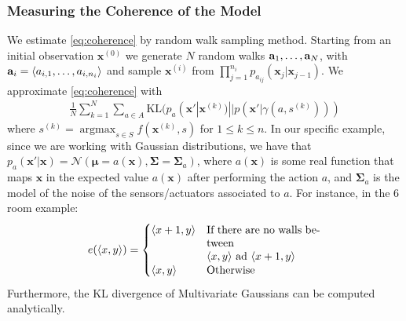 \documentclass{beamer}
\DeclareMathOperator*{\argmax}{argmax}
\def\N{\mathcal{N}}
\def\bmu{\pmb{\mu}}
\def\bSigma{\pmb{\Sigma}}
\def\bx{\pmb{x}}
\begin{document}
\begin{frame}
\frametitle{Measuring the Coherence of the Model}
\footnotesize
We estimate \eqref{eq:coherence} by random walk sampling method. Starting
from an initial observation $\bx^{(0)}$ we generate $N$ random
walks ${\bf a}_1,\dots,{\bf a}_N$, 
%
with
${\bf a}_i=\langle a_{i,1},\dots,a_{i,n_i}\rangle$ and sample $\bx^{(i)}$
from $\prod_{j=1}^{n_i}p_{a_{ij}}(\bx_{j}|\bx_{j-1})$. 
We approximate \eqref{eq:coherence} with
\begin{align}
  \label{eq:coherence-approx}
\frac{1}{N}\sum_{k=1}^N\sum_{a\in A}\mathrm{KL}(p_a(\bx'|\bx^{(k)})|| p(\bx'|\gamma(a,s^{(k)})))
\end{align}
where $s^{(k)} = \argmax_{s\in S}f(\bx^{(k)},s)$ for $1\leq k \leq
n$. 
In our specific example, since we are working with Gaussian
distributions, we have that 
%
$p_a(\bx'|\bx) =
\N(\bmu=a(\bx),\bSigma=\bSigma_a)$,
%
where $a(\bx)$ 
is some real function that maps  
$\bx$ in the expected value $a(\bx)$ after performing the action $a$, and $\bSigma_a$ is the model of the noise of the
sensors/actuators associated to $a$. For instance, in the 6 room example:
$$
e(\langle x,y\rangle)=
\begin{cases}
  \langle x+1,y\rangle & \parbox[t]{.3\textwidth}{If there are no walls
    between \\ $\left<x,y\right>$ ad $\left<x+1,y\right>$} \\
    \langle x,y\rangle & \mbox{Otherwise}
  \end{cases}
  $$
Furthermore, the KL divergence of Multivariate Gaussians can be
computed analytically. 


\end{frame}
    
\end{document}
